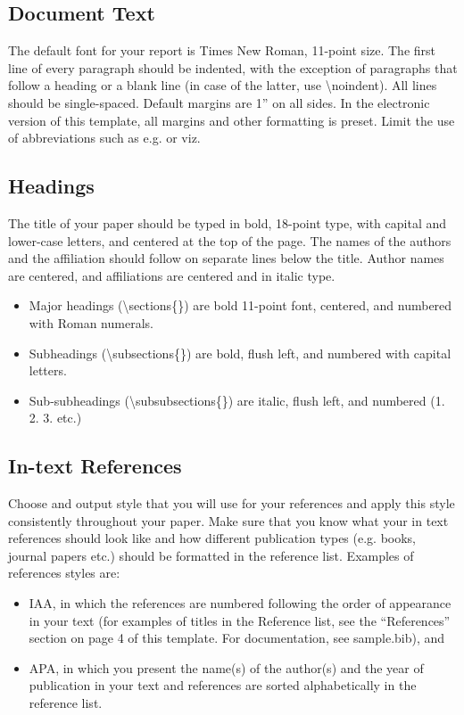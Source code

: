 \subsection{Document Text}
The default font for your report is Times New Roman, 11-point size. The first line of every paragraph should be indented, with the exception of paragraphs that follow a heading or a blank line (in case of the latter, use \textbackslash noindent). All lines should be single-spaced. Default margins are 1” on all sides. In the electronic version of this template, all margins and other formatting is preset. Limit the use of abbreviations such as e.g. or viz.

\subsection{Headings}
The title of your paper should be typed in bold, 18-point type, with capital and lower-case letters, and centered at the top of the page. The names of the authors and the affiliation should follow on separate lines below the title. Author names are centered, and affiliations are centered and in italic type.

\begin{itemize}
    \item Major headings (\textbackslash sections\{\}) are bold 11-point font, centered, and numbered with Roman numerals.
    \item Subheadings (\textbackslash subsections\{\}) are bold, flush left, and numbered with capital letters.
    \item Sub-subheadings (\textbackslash subsubsections\{\}) are italic, flush left, and numbered (1. 2. 3. etc.)
\end{itemize}

\subsection{In-text References}
Choose and output style that you will use for your references and apply this style consistently throughout your paper. Make sure that you know what your in text references should look like and how different publication types (e.g. books, journal papers etc.) should  be formatted in the reference list.  Examples of references styles are: 

\begin{itemize}
    \item IAA, in which the references are numbered following the order of appearance in your text (for examples of titles in the Reference list, see the “References” section on page 4 of this template. For documentation, see sample.bib), and
    \item APA, in which you present the name(s) of the author(s) and the year of publication in your text and references are sorted alphabetically in the reference list.  	
\end{itemize}

